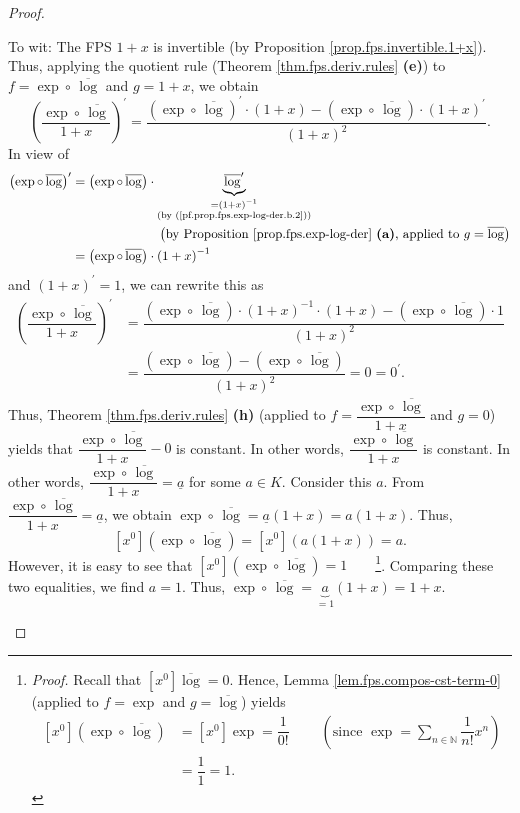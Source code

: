 \begin{proof}
\begin{itemize}
To wit: The FPS $1+x$ is invertible (by Proposition
\ref{prop.fps.invertible.1+x}). Thus, applying the quotient rule (Theorem
\ref{thm.fps.deriv.rules} \textbf{(e)}) to $f=\exp\circ\,\overline{\log}$ and
$g=1+x$, we obtain%
\[
\left(  \dfrac{\exp\circ\,\overline{\log}}{1+x}\right)  ^{\prime}%
=\dfrac{\left(  \exp\circ\,\overline{\log}\right)  ^{\prime}\cdot\left(
1+x\right)  -\left(  \exp\circ\,\overline{\log}\right)  \cdot\left(
1+x\right)  ^{\prime}}{\left(  1+x\right)  ^{2}}.
\]
In view of%
\begin{align*}
\left(  \exp\circ\,\overline{\log}\right)  ^{\prime}  &  =\left(  \exp
\circ\,\overline{\log}\right)  \cdot\underbrace{\overline{\log}^{\prime}%
}_{\substack{=\left(  1+x\right)  ^{-1}\\\text{(by
(\ref{pf.prop.fps.exp-log-der.b.2}))}}}\\
&  \ \ \ \ \ \ \ \ \ \ \ \ \ \ \ \ \ \ \ \ \left(  \text{by Proposition
\ref{prop.fps.exp-log-der} \textbf{(a)}, applied to }g=\overline{\log}\right)
\\
&  =\left(  \exp\circ\,\overline{\log}\right)  \cdot\left(  1+x\right)  ^{-1}%
\end{align*}
and $\left(  1+x\right)  ^{\prime}=1$, we can rewrite this as%
\begin{align*}
\left(  \dfrac{\exp\circ\,\overline{\log}}{1+x}\right)  ^{\prime}  &
=\dfrac{\left(  \exp\circ\,\overline{\log}\right)  \cdot\left(  1+x\right)
^{-1}\cdot\left(  1+x\right)  -\left(  \exp\circ\,\overline{\log}\right)
\cdot1}{\left(  1+x\right)  ^{2}}\\
&  =\dfrac{\left(  \exp\circ\,\overline{\log}\right)  -\left(  \exp
\circ\,\overline{\log}\right)  }{\left(  1+x\right)  ^{2}}=0=0^{\prime}.
\end{align*}
Thus, Theorem \ref{thm.fps.deriv.rules} \textbf{(h)} (applied to
$f=\dfrac{\exp\circ\,\overline{\log}}{1+x}$ and $g=0$) yields that
$\dfrac{\exp\circ\,\overline{\log}}{1+x}-0$ is constant. In other words,
$\dfrac{\exp\circ\,\overline{\log}}{1+x}$ is constant. In other words,
$\dfrac{\exp\circ\,\overline{\log}}{1+x}=\underline{a}$ for some $a\in K$.
Consider this $a$. From $\dfrac{\exp\circ\,\overline{\log}}{1+x}%
=\underline{a}$, we obtain $\exp\circ\,\overline{\log}=\underline{a}\left(
1+x\right)  =a\left(  1+x\right)  $. Thus,%
\[
\left[  x^{0}\right]  \left(  \exp\circ\,\overline{\log}\right)  =\left[
x^{0}\right]  \left(  a\left(  1+x\right)  \right)  =a.
\]
However, it is easy to see that $\left[  x^{0}\right]  \left(  \exp
\circ\,\overline{\log}\right)  =1$\ \ \ \ \footnote{\textit{Proof.} Recall
that $\left[  x^{0}\right]  \overline{\log}=0$. Hence, Lemma
\ref{lem.fps.compos-cst-term-0} (applied to $f=\exp$ and $g=\overline{\log}$)
yields
\begin{align*}
\left[  x^{0}\right]  \left(  \exp\circ\,\overline{\log}\right)   &  =\left[
x^{0}\right]  \exp=\dfrac{1}{0!}\ \ \ \ \ \ \ \ \ \ \left(  \text{since }%
\exp=\sum_{n\in\mathbb{N}}\dfrac{1}{n!}x^{n}\right) \\
&  =\dfrac{1}{1}=1.
\end{align*}
}. Comparing these two equalities, we find $a=1$. Thus, $\exp\circ
\,\overline{\log}=\underbrace{a}_{=1}\left(  1+x\right)  =1+x$.


\end{itemize}
\end{proof}
